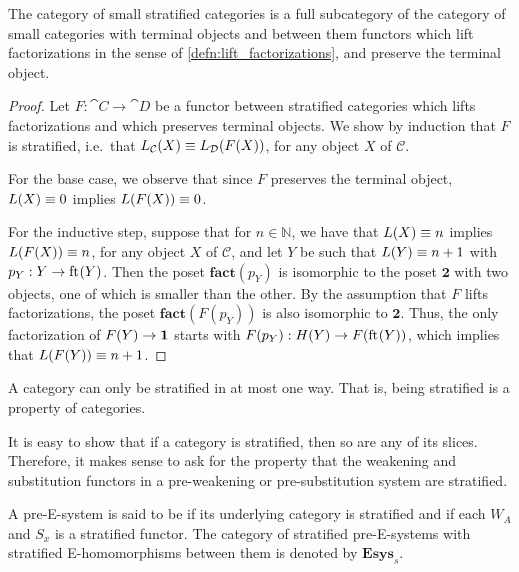 \begin{lem}
The category of small stratified categories is a full subcategory of the category
of small categories with terminal objects and between them functors which lift 
factorizations in the sense of \autoref{defn:lift_factorizations}, and preserve the terminal object.
\end{lem}

\begin{proof}
Let $F:\cat{C}\to\cat{D}$ be a functor between stratified categories which lifts
factorizations and 
which preserves terminal objects. We show by induction that $F$ is stratified, i.e.~that $L_{\mathcal{C}}(X)\equiv L_{\mathcal{D}}(F(X))$, for any object $X$ of $\mathcal{C}$.

For the base case, we observe that since $F$ preserves the terminal object, $L(X)\equiv 0$ implies $L(F(X))\equiv 0$.

For the inductive step, suppose that for $n\in\mathbb{N}$, we have that $L(X)\equiv n$ implies
$L(F(X))\equiv n$, for any object $X$ of $\mathcal{C}$, and let $Y$ be such that $L(Y)\equiv n+1$ with
$p_Y:Y\to\mathrm{ft}_{}(Y)$. Then the poset $\mathbf{fact}(p_Y)$ is isomorphic to the
poset $\mathbf{2}$ with two objects, one of which is smaller than the other. By the
assumption that $F$ lifts factorizations, the poset $\mathbf{fact}(F(p_Y))$
is also isomorphic to $\mathbf{2}$. Thus, the only factorization
of $F(Y)\to\mathbf{1}$ starts with $F(p_Y):H(Y)\to F(\mathrm{ft}_{}(Y))$, which implies that
$L(F(Y))\equiv n+1$. 
\end{proof}

\begin{cor}
A category can only be stratified in at most one way. That is, being stratified is a property of categories.
\end{cor}

\begin{rmk}
It is easy to show that if a category is stratified, then so are any of its slices. Therefore,
it makes sense to ask for the property that the weakening and substitution
functors in a pre-weakening or pre-substitution system are stratified.
\end{rmk}

\begin{defn}
A pre-E-system is said to be  if its underlying category is
stratified and if each $W_A$ and $S_x$ is a stratified functor. The category of
stratified pre-E-systems with stratified E-homomorphisms between them is denoted by
$\mathbf{Esys}_s$.
\end{defn}

